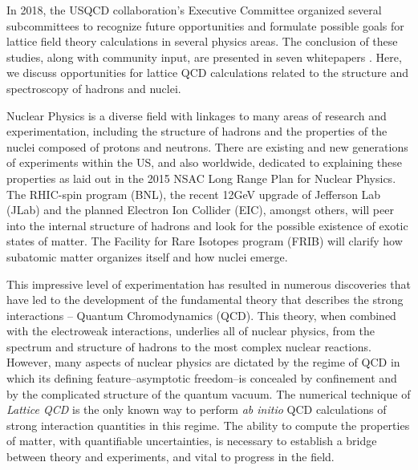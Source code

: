 In 2018, the USQCD collaboration's Executive Committee organized several subcommittees to recognize future opportunities and formulate possible goals for lattice field theory calculations in several physics areas. The conclusion of these studies, along with community input, are presented in seven whitepapers \cite{Bazavov:2018qcd,Brower:2018qcd,Davoudi:2018qcd,Detmold:2018qcd,Joo:2018qcd,Kronfeld:2018qcd,Lehner:2018qcd}. Here, we discuss opportunities for lattice QCD calculations related to the structure and spectroscopy of hadrons and nuclei. 

Nuclear Physics is a diverse field with linkages to many areas of
research and experimentation, including the structure of  hadrons
and the properties of the nuclei composed of protons and neutrons.
There are existing and new generations of experiments within the US,
and also worldwide, dedicated to explaining these properties as laid
out in the 2015 NSAC Long Range Plan for Nuclear Physics.  The
RHIC-spin program (BNL), the recent
12GeV upgrade of Jefferson Lab (JLab) and the planned Electron Ion
Collider (EIC), amongst others, will peer into the internal structure of hadrons and
look for the possible existence of exotic states of matter. The
Facility for Rare Isotopes program (FRIB) will clarify how subatomic
matter organizes itself and how nuclei emerge.

This impressive level of experimentation has resulted in
numerous discoveries that have led to the development of the
fundamental theory that describes the strong interactions -- Quantum
Chromodynamics (QCD). This theory, when combined with the electroweak
interactions, underlies all of nuclear physics, from the spectrum and
structure of hadrons to the most complex nuclear reactions. However,
many aspects of nuclear physics are dictated by the regime of QCD in
which its defining feature--asymptotic freedom--is concealed by
confinement and by the complicated structure of the quantum
vacuum. The numerical technique of {\it Lattice QCD} is the only known
way to perform {\it ab initio} QCD calculations of strong interaction
quantities in this regime. The ability to compute the properties of
matter, with quantifiable uncertainties, is necessary to establish
a bridge between theory and experiments, and vital to progress in the
field.  

